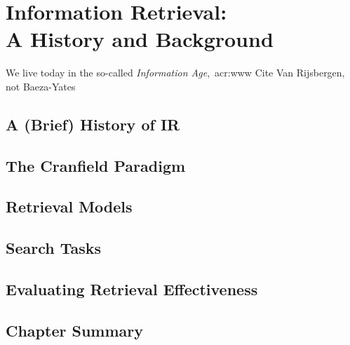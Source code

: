 
\chapter[Information Retrieval]{Information Retrieval:\\A History and Background}\label{chap:ir_background}
We live today in the so-called \emph{Information Age},~\gls{acr:www}
Cite Van Rijsbergen, not Baeza-Yates

\section{A (Brief) History of IR}

\section{The Cranfield Paradigm}

\section{Retrieval Models}

\section{Search Tasks}

\section{Evaluating Retrieval Effectiveness}

\section{Chapter Summary}